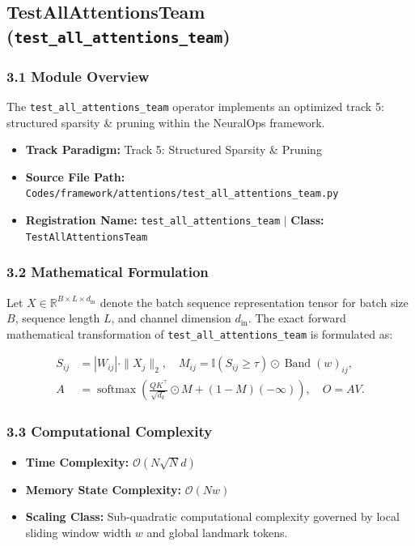\subsection{TestAllAttentionsTeam (\texttt{test\_all\_attentions\_team})}
\label{sec:app_module_test\_all\_attentions\_team}

\subsubsection*{3.1 Module Overview}
The \texttt{test\_all\_attentions\_team} operator implements an optimized track 5: structured sparsity \& pruning within the NeuralOps framework.
\begin{itemize}
    \item \textbf{Track Paradigm:} Track 5: Structured Sparsity & Pruning
    \item \textbf{Source File Path:} \texttt{Codes/framework/attentions/test\_all\_attentions\_team.py}
    \item \textbf{Registration Name:} \texttt{test\_all\_attentions\_team} $\mid$ \textbf{Class:} \texttt{TestAllAttentionsTeam}
\end{itemize}

\subsubsection*{3.2 Mathematical Formulation}
Let $X \in \mathbb{R}^{B \times L \times d_{\text{in}}}$ denote the batch sequence representation tensor for batch size $B$, sequence length $L$, and channel dimension $d_{\text{in}}$. The exact forward mathematical transformation of \texttt{test\_all\_attentions\_team} is formulated as:

\begin{align}
S_{ij} &= |W_{ij}| \cdot \|X_j\|_2, \quad M_{ij} = \mathbb{I}(S_{ij} \ge \tau) \odot \operatorname{Band}(w)_{ij}, \\
A &= \operatorname{softmax}\left(\frac{Q K^\top}{\sqrt{d_k}} \odot M + (1 - M)(-\infty)\right), \quad O = A V.
\end{align}


\subsubsection*{3.3 Computational Complexity}
\begin{itemize}
    \item \textbf{Time Complexity:} $\mathcal{O}(N \sqrt{N} d)$
    \item \textbf{Memory State Complexity:} $\mathcal{O}(N w)$
    \item \textbf{Scaling Class:} Sub-quadratic computational complexity governed by local sliding window width $w$ and global landmark tokens.
\end{itemize}

